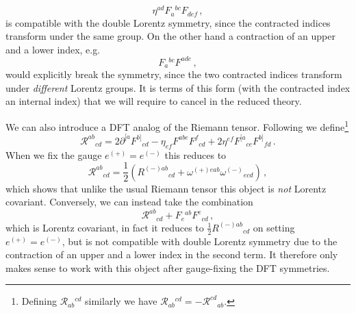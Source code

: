\documentclass[a4paper,11pt]{article}
\begin{document}
\begin{equation}
\eta^{ad}F_a{}^{bc}F_{def}\,,
\end{equation}
is compatible with the double Lorentz symmetry, since the contracted indices transform under the same group. On the other hand a contraction of an upper and a lower index, e.g.
\begin{equation}
F_a{}^{bc}F^{ade}\,,
\end{equation}
would explicitly break the symmetry, since the two contracted indices transform under \emph{different} Lorentz groups. It is terms of this form (with the contracted index an internal index) that we will require to cancel in the reduced theory.

We can also introduce a DFT analog of the Riemann tensor. Following \cite{Hronek:2020skb} we define\footnote{Defining $\mathcal R_{ab}{}^{cd}$ similarly we have $\mathcal R_{ab}{}^{cd}=-\mathcal R^{cd}{}_{ab}$.}
\begin{equation}
\mathcal R^{ab}{}_{cd}=2\partial^{[a}F^{b]}{}_{cd}-\eta_{ef}F^{abe}F^f{}_{cd}+2\eta^{ef}F^{[a}{}_{ce}F^{b]}{}_{fd}\,.
\label{eq:R}
\end{equation}
When we fix the gauge $e^{(+)}=e^{(-)}$ this reduces to
\begin{equation}
\mathcal R^{ab}{}_{cd}
=
\frac12
(
R^{(-)ab}{}_{cd}
+\omega^{(+)eab}\omega^{(-)}{}_{ecd}
)\,,
\end{equation}
which shows that unlike the usual Riemann tensor this object is \emph{not} Lorentz covariant. Conversely, we can instead take the combination
\begin{equation}
\mathcal R^{ab}{}_{cd}+F_e{}^{ab}F^e{}_{cd}\,,
\label{eq:R'}
\end{equation}
which is Lorentz covariant, in fact it reduces to $\frac12R^{(-)ab}{}_{cd}$ on setting $e^{(+)}=e^{(-)}$, but is not compatible with double Lorentz symmetry due to the contraction of an upper and a lower index in the second term. It therefore only makes sense to work with this object after gauge-fixing the DFT symmetries.
\end{document}
